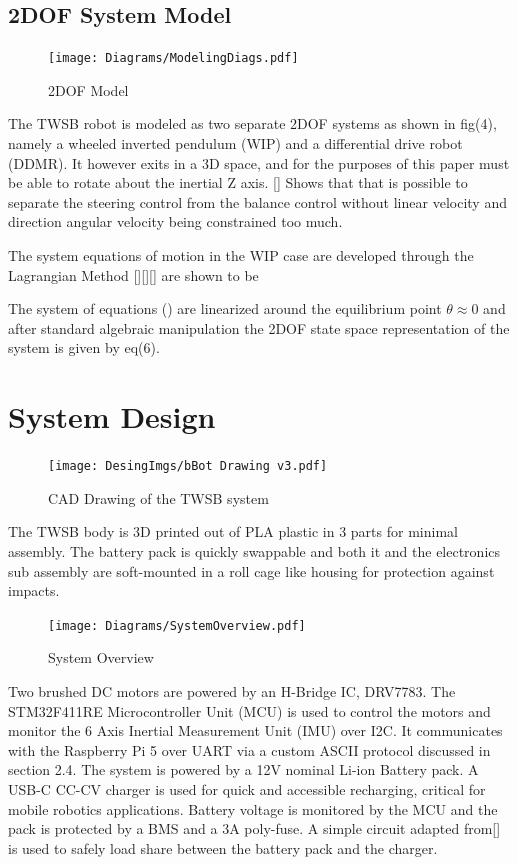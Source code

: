     \pagebreak{}

    \subsection{2DOF System Model}

    \begin{figure}[H]
        \texttt{[image: Diagrams/ModelingDiags.pdf]}
        \caption{2DOF Model}
    \end{figure}

    The TWSB robot is modeled as two separate 2DOF systems as shown in fig(4), 
    namely a wheeled inverted pendulum (WIP) and a differential drive robot (DDMR).
    It however exits in a 3D space, and for the purposes of this paper must be able to rotate about the inertial Z axis. 
    [] Shows that that is possible to separate the steering control from the balance control 
    without linear velocity and direction angular velocity being constrained too much. 
   

    The system equations of motion in the WIP case are developed through the Lagrangian Method [][][] are shown to be 
    
    The system of equations () are linearized around the equilibrium point $\theta\approx 0$  and after standard algebraic manipulation the 
    2DOF state space representation of the system is given by eq(6).


   
    \pagebreak{}

    \section{System Design}
        \begin{figure}[H]
            \texttt{[image: DesingImgs/bBot Drawing v3.pdf]}
            \caption{CAD Drawing of the TWSB system}
        \end{figure}

        The TWSB body is 3D printed out of PLA plastic in 3 parts for minimal assembly.
        The battery pack is quickly swappable and both it and the electronics sub assembly 
        are soft-mounted in a roll cage like housing for protection against impacts. 
        \begin{figure}[H]
            \centering
            \texttt{[image: Diagrams/SystemOverview.pdf]}
            \caption{System Overview}
        \end{figure}

        Two brushed DC motors are powered by an H-Bridge IC, DRV7783. 
        The STM32F411RE Microcontroller Unit (MCU) is used to control the 
        motors and monitor the 6 Axis Inertial Measurement Unit (IMU) over I2C. It communicates with the 
        Raspberry Pi 5 over UART via a custom ASCII protocol discussed in section 2.4. 
        The system is powered by a 12V nominal Li-ion Battery pack. A USB-C CC-CV charger is used for quick 
        and accessible recharging, critical for mobile robotics applications. 
        Battery voltage is monitored by the MCU and the pack is protected by a BMS and a 3A poly-fuse.
        A simple circuit adapted from[] is used to safely load share between the battery pack and the charger.

